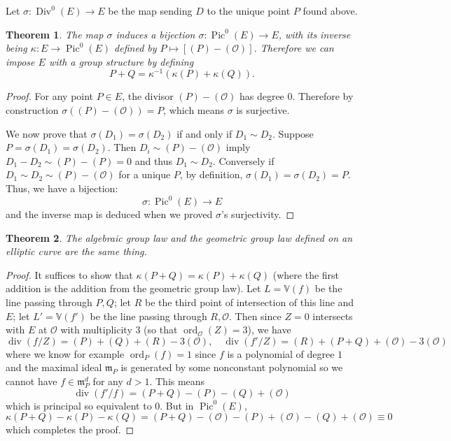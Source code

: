 \documentclass[12pt]{article}
\newtheorem{theorem}{Theorem}[subsection]
\theoremstyle{remark}
\theoremstyle{definition}
\newcommand{\ord}[0]{\operatorname{ord}}
\newcommand{\s}[0]{\sigma}
\newcommand{\ecO}[0]{\mathcal O}
\newcommand{\kp}[0]{\kappa}
\newcommand{\Div}[0]{\operatorname{Div}}
\newcommand{\pdiv}[0]{\operatorname{div}}
\newcommand{\Pic}[0]{\operatorname{Pic}}
\begin{document}
            Let $\s:\Div^0(E)\to E$ be the map sending $D$ to the unique point $P$ found above.
            \begin{theorem}\label{theorem-alg-group}
                The map $\s$ induces a bijection $\s:\Pic^0(E)\to E$, with its inverse being $\kp:E\to\Pic^0(E)$ defined by $P\mapsto [(P)-(\mathcal O)]$. Therefore we can impose $E$ with a group structure by defining
                \[P+Q=\kp^{-1}(\kp(P)+\kp(Q)).\]
            \end{theorem}
            \begin{proof}
                For any point $P\in E$, the divisor $(P)-(\mathcal O)$ has degree $0$. Therefore by construction $\s((P)-(\mathcal O))=P$, which means $\s$ is surjective.
    
                We now prove that $\s(D_1)=\s(D_2)$ if and only if $D_1\sim D_2$. Suppose $P=\s(D_1)=\s(D_2)$. Then $D_i\sim (P)-(\ecO)$ imply $D_1-D_2\sim(P)-(P)=0$ and thus $D_1\sim D_2$. Conversely if $D_1\sim D_2\sim (P)-(\ecO)$ for a unique $P$, by definition, $\s(D_1)=\s(D_2)=P$. Thus, we have a bijection:
                \[\s:\Pic^0(E)\to E\]
                and the inverse map is deduced when we proved $\s$'s surjectivity.
            \end{proof}
            \begin{theorem}\label{theorem=same-law}
                The algebraic group law and the geometric group law defined on an elliptic curve are the same thing.
            \end{theorem}
            \begin{proof}
                It suffices to show that $\kp(P+Q)=\kp(P)+\kp(Q)$ (where the first addition is the addition from the geometric group law). Let $L=\mathbb V(f)$ be the line passing through $P,Q$; let $R$ be the third point of intersection of this line and $E$; let $L'=\mathbb V(f')$ be the line passing through $R,\ecO$. Then since $Z=0$ intersects with $E$ at $\ecO$ with multiplicity $3$ (so that $\ord_\ecO (Z)=3$), we have
                \[\pdiv(f/Z)=(P)+(Q)+(R)-3(\ecO),\quad \pdiv(f'/Z)=(R)+(P+Q)+(\ecO)-3(\ecO)\]
                where we know for example $\ord_P(f)=1$ since $f$ is a polynomial of degree $1$ and the maximal ideal $\mathfrak m_P$ is generated by some nonconstant polynomial so we cannot have $f\in \mathfrak m_P^d$ for any $d>1$. This means
                \[\pdiv(f'/f)=(P+Q)-(P)-(Q)+(\ecO)\]
                which is principal so equivalent to $0$. But in $\Pic^0(E)$,
                \[\kp(P+Q)-\kp(P)-\kp(Q)=(P+Q)-(\ecO)-(P)+(\ecO)-(Q)+(\ecO)\equiv 0\]
                which completes the proof.
            \end{proof}
\end{document}
